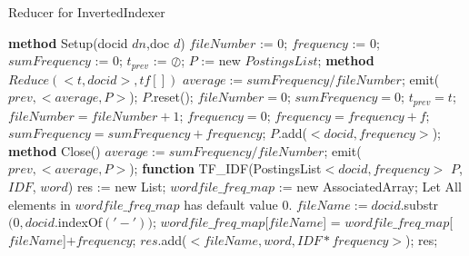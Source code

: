 \documentclass[a4paper,UTF8]{article}
\theoremstyle{definition}
\begin{document}
\begin{CJK}{UTF8}{gkai}
\begin{algorithm}[H]
\caption{Reducer for InvertedIndexer}
\label{alg:Framwork}
\begin{algorithmic}[1] %
	 \STATE \textbf{method} Setup(docid $dn$,doc $d$)
	 \STATE $fileNumber$ := $0$;
	 \STATE $frequency$ := $0$;
	 \STATE $sumFrequency$ := $0$;
	 \STATE $t_{prev}$ := $\oslash$;
	 \STATE $P$ := new $PostingsList$;
	 \STATE 
    \STATE \textbf{method} $Reduce(<t, docid>, tf[])$
		\STATE $average:=sumFrequency/fileNumber$;
	 	\STATE emit($prev, <average, P>$);
		\STATE $P$.reset();
		\STATE $fileNumber = 0$;
		\STATE $sumFrequency = 0$;
	 \ENDIF
	 \STATE $t_{prev} = t$;
	 \STATE $fileNumber = fileNumber + 1$;
	 \STATE $frequency = 0$;
	 	\STATE $frequency = frequency + f$;
	 \ENDFOR
	 \STATE $sumFrequency = sumFrequency + frequency$;
	 \STATE $P$.add($<docid, frequency>$);
	\STATE
    \STATE \textbf{method} Close()
		\STATE $average:=sumFrequency/fileNumber$;
	 	\STATE emit($prev, <average, P>$);
	 \STATE
    \STATE \textbf{function} TF\_IDF(PostingsList$<docid, frequency>$ $P$, $IDF$, $word$)
	 \STATE res := new List;
	 \STATE $wordfile\_freq\_map$ := new AssociatedArray;
	 \STATE Let All elements in $wordfile\_freq\_map$ has default value $0$.
		\STATE $fileName := docid$.substr$(0, docid.$indexOf$('-'))$;
		\STATE $wordfile\_freq\_map$[$fileName$] = $wordfile\_freq\_map$[$fileName$]$ + frequency$;
	 \ENDFOR
	 	\STATE $res$.add($<fileName, word, IDF*frequency>$);
	 \ENDFOR
	 \RETURN res;
\end{algorithmic}
\end{algorithm}
	
\begin{CJK*}{UTF8}{gbsn}

\end{CJK*}
\end{CJK}
\end{document}
